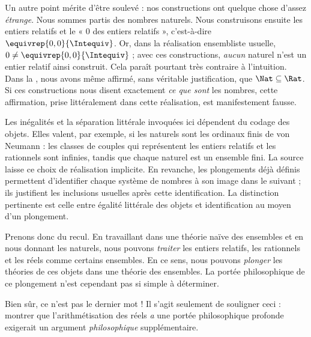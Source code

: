 \documentclass[11pt,a4paper,openany]{memoir}
\begin{document}
Un autre point mérite d'être soulevé : nos constructions ont quelque
chose d'assez \emph{étrange}. Nous sommes partis des nombres naturels.
Nous construisons ensuite les entiers relatifs et le « $0$ des entiers
relatifs », c'est-à-dire $\equivrep{0,0}{\Intequiv}$.
Or, dans la réalisation ensembliste usuelle,
$0\neq\equivrep{0,0}{\Intequiv}$ ; avec ces constructions,
\emph{aucun} naturel n'est un entier relatif ainsi construit.
Cela paraît pourtant très contraire à l'intuition.
Dans la , nous avons même affirmé,
sans véritable justification, que $\Nat\subseteq\Rat$.
Si ces constructions nous disent exactement \emph{ce que sont}
les nombres, cette affirmation, prise littéralement dans cette
réalisation, est manifestement fausse.
\begin{editorial}
Les inégalités et la séparation littérale invoquées ici dépendent du
codage des objets. Elles valent, par exemple, si les naturels sont les
ordinaux finis de von Neumann : les classes de couples qui représentent
les entiers relatifs et les rationnels sont infinies, tandis que chaque
naturel est un ensemble fini. La source laisse ce choix de réalisation
implicite. En revanche, les plongements déjà définis permettent
d'identifier chaque système de nombres à son image dans le suivant ;
ils justifient les inclusions usuelles après cette identification.
La distinction pertinente est celle entre égalité littérale des objets
et identification au moyen d'un plongement.
\end{editorial}

Prenons donc du recul. En travaillant dans une théorie naïve des
ensembles et en nous donnant les naturels, nous pouvons \emph{traiter}
les entiers relatifs, les rationnels et les réels comme certains
ensembles. En ce sens, nous pouvons \emph{plonger} les théories de
ces objets dans une théorie des ensembles. La portée philosophique
de ce plongement n'est cependant pas si simple à déterminer.

Bien sûr, ce n'est pas le dernier mot !{} Il s'agit seulement de
souligner ceci : montrer que l'arithmétisation des réels \emph{a}
une portée philosophique profonde exigerait un argument
\emph{philosophique} supplémentaire.



\endgroup
\end{document}

